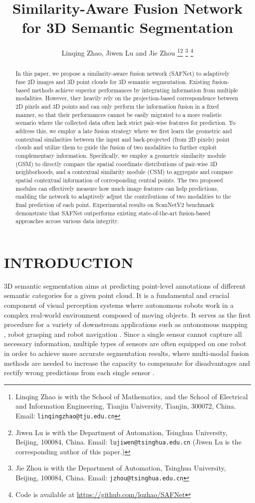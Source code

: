 \documentclass[letterpaper, 10 pt, conference]{ieeeconf}
\title{\LARGE \bf
Similarity-Aware Fusion Network for 3D Semantic Segmentation
}
\author{Linqing Zhao, Jiwen Lu and Jie Zhou
\thanks{Linqing Zhao is with the School of Mathematics, and the School of Electrical and Information Engineering, Tianjin University, Tianjin, 300072, China. Email: {\tt\small linqingzhao@tju.edu.cn}}\thanks{
Jiwen Lu is with the Department of Automation, Tsinghua University, Beijing, 100084, China. Email: {\tt\small lujiwen@tsinghua.edu.cn} (Jiwen Lu is the corresponding author of this paper.)}
\thanks{
Jie Zhou is with the Department of Automation, Tsinghua University, Beijing, 100084, China. Email: {\tt\small jzhou@tsinghua.edu.cn}}
\thanks{
Code is available at \url{https://github.com/lqzhao/SAFNet}}
}
\begin{document}
\maketitle
\thispagestyle{empty}
\pagestyle{empty}


\begin{abstract}


In this paper, we propose a similarity-aware fusion network (SAFNet) to adaptively fuse 2D images and 3D point clouds for 3D semantic segmentation.
Existing fusion-based methods achieve superior performances by integrating information from multiple modalities. However, they heavily rely on the projection-based correspondence between 2D pixels and 3D points and can only perform the information fusion in a fixed manner, so that their performances cannot be easily migrated to a more realistic scenario where the collected data often lack strict pair-wise features for prediction.
To address this, we employ a late fusion strategy where we first learn the geometric and contextual similarities between the input and back-projected (from 2D pixels) point clouds and utilize them to guide the fusion of two modalities to further exploit complementary information.
Specifically, we employ a geometric similarity module (GSM) to directly compare the spatial coordinate distributions of pair-wise 3D neighborhoods, and a contextual similarity module (CSM) to aggregate and compare spatial contextual information of corresponding central points.
The two proposed modules can effectively measure how much image features can help predictions, enabling the network to adaptively adjust the contributions of two modalities to the final prediction of each point. 
Experimental results on ScanNetV2 \cite{dai2017scannet} benchmark demonstrate that SAFNet outperforms existing state-of-the-art fusion-based approaches across various data integrity. 


\end{abstract}


\section{INTRODUCTION}

3D semantic segmentation aims at predicting point-level annotations of different semantic categories for a given point cloud. It is a fundamental and crucial component of visual perception systems where autonomous robots work in a complex real-world environment composed of moving objects. It serves as the first procedure for a variety of downstream applications such as  autonomous mapping \cite{tateno20162,mahe2019real}, robot grasping \cite{satish2019policy,zhang2018road} and robot navigation \cite{rashed2019motion,teso2020semantic}. Since a single sensor cannot capture all necessary information, multiple types of sensors are often equipped on one robot in order to achieve more accurate segmentation results, where multi-modal fusion methods are needed to increase the capacity to compensate for disadvantages and rectify wrong predictions from each single sensor \cite{wu2019pointconv,liang2019multi,wang2019densefusion,Chen_2019_ICCV,qi2017frustum}.
\end{document}
